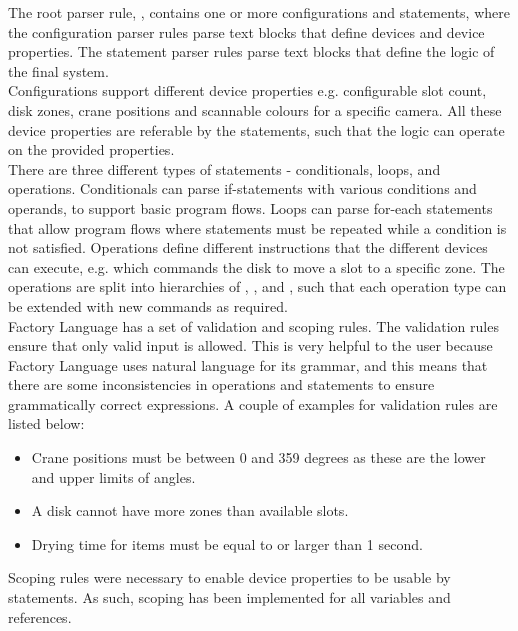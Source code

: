 The root parser rule, , contains one or more configurations and statements, where the configuration parser rules parse text blocks that define devices and device properties. The statement parser rules parse text blocks that define the logic of the final system.\\

Configurations support different device properties e.g. configurable slot count, disk zones, crane positions and scannable colours for a specific camera. All these device properties are referable by the statements, such that the logic can operate on the provided properties.\\

There are three different types of statements - conditionals, loops, and operations. Conditionals can parse if-statements with various conditions and operands, to support basic program flows. Loops can parse for-each statements that allow program flows where statements must be repeated while a condition is not satisfied. Operations define different instructions that the different devices can execute, e.g.  which commands the disk to move a slot to a specific zone. The operations are split into hierarchies of , , and , such that each operation type can be extended with new commands as required.\\

Factory Language has a set of validation and scoping rules. The validation rules ensure that only valid input is allowed. This is very helpful to the user because Factory Language uses natural language for its grammar, and this means that there are some inconsistencies in operations and statements to ensure grammatically correct expressions. A couple of examples for validation rules are listed below:

\begin{itemize}
    \item Crane positions must be between 0 and 359 degrees as these are the lower and upper limits of angles.
    \item A disk cannot have more zones than available slots.
    \item Drying time for items must be equal to or larger than 1 second.
\end{itemize}

Scoping rules were necessary to enable device properties to be usable by statements. As such, scoping has been implemented for all variables and references.

